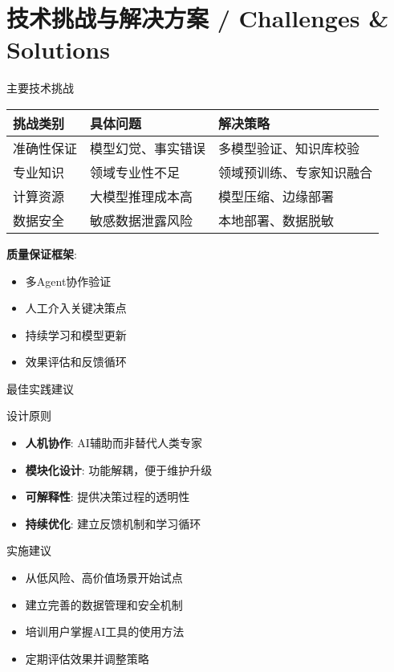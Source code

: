 \documentclass[aspectratio=169]{beamer}
\begin{document}
\section{技术挑战与解决方案 / Challenges \& Solutions}

\begin{frame}{主要技术挑战}
\begin{table}
\centering
\small
\begin{tabular}{p{3cm}|p{4cm}|p{4cm}}
\toprule
\textbf{挑战类别} & \textbf{具体问题} & \textbf{解决策略} \\
\midrule
准确性保证 & 模型幻觉、事实错误 & 多模型验证、知识库校验 \\
专业知识 & 领域专业性不足 & 领域预训练、专家知识融合 \\
计算资源 & 大模型推理成本高 & 模型压缩、边缘部署 \\
数据安全 & 敏感数据泄露风险 & 本地部署、数据脱敏 \\
\bottomrule
\end{tabular}
\end{table}

\vspace{1em}
\textbf{质量保证框架}:
\begin{itemize}
    \item 多Agent协作验证
    \item 人工介入关键决策点
    \item 持续学习和模型更新
    \item 效果评估和反馈循环
\end{itemize}
\end{frame}

\begin{frame}{最佳实践建议}
\begin{block}{设计原则}
\begin{itemize}
    \item \textbf{人机协作}: AI辅助而非替代人类专家
    \item \textbf{模块化设计}: 功能解耦，便于维护升级
    \item \textbf{可解释性}: 提供决策过程的透明性
    \item \textbf{持续优化}: 建立反馈机制和学习循环
\end{itemize}
\end{block}

\begin{block}{实施建议}
\begin{itemize}
    \item 从低风险、高价值场景开始试点
    \item 建立完善的数据管理和安全机制
    \item 培训用户掌握AI工具的使用方法
    \item 定期评估效果并调整策略
\end{itemize}
\end{block}
\end{frame}
\end{document}
